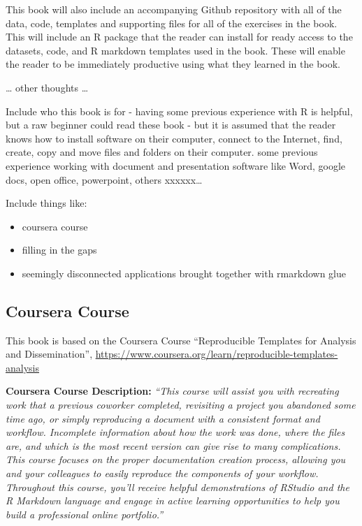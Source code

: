 \documentclass[
]{book}
\providecommand{\tightlist}{%
  \setlength{\itemsep}{0pt}\setlength{\parskip}{0pt}}
\begin{document}
This book will also include an accompanying Github repository with all of the data, code, templates and supporting files for all of the exercises in the book. This will include an R package that the reader can install for ready access to the datasets, code, and R markdown templates used in the book. These will enable the reader to be immediately productive using what they learned in the book.

\ldots{} other thoughts \ldots{}

Include who this book is for - having some previous experience with R is helpful, but a raw beginner could read these book - but it is assumed that the reader knows how to install software on their computer, connect to the Internet, find, create, copy and move files and folders on their computer. some previous experience working with document and presentation software like Word, google docs, open office, powerpoint, others xxxxxx\ldots{}

Include things like:

\begin{itemize}
\tightlist
\item
  coursera course
\item
  filling in the gaps
\item
  seemingly disconnected applications brought together with rmarkdown glue
\end{itemize}

\hypertarget{coursera-course}{%
\subsection*{Coursera Course}\label{coursera-course}}

This book is based on the Coursera Course ``Reproducible Templates for Analysis and Dissemination'', \url{https://www.coursera.org/learn/reproducible-templates-analysis}

\textbf{Coursera Course Description:} \emph{``This course will assist you with recreating work that a previous coworker completed, revisiting a project you abandoned some time ago, or simply reproducing a document with a consistent format and workflow. Incomplete information about how the work was done, where the files are, and which is the most recent version can give rise to many complications. This course focuses on the proper documentation creation process, allowing you and your colleagues to easily reproduce the components of your workflow. Throughout this course, you'll receive helpful demonstrations of RStudio and the R Markdown language and engage in active learning opportunities to help you build a professional online portfolio.''}
\end{document}
